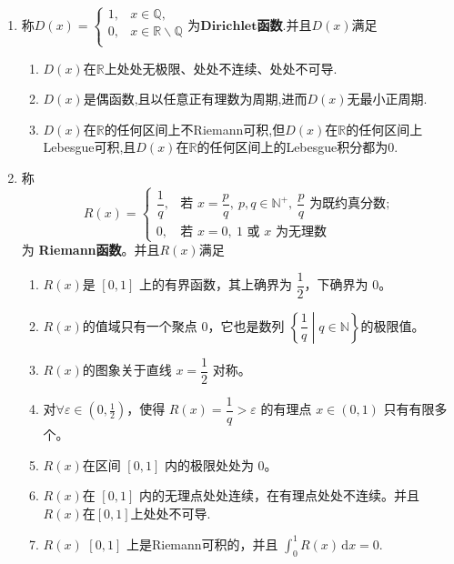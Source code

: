 \documentclass[../../main.tex]{subfiles}%
\begin{document}
\begin{theorem}[Dirichlet函数和Riemann函数的定义及其性质]\label{theorem:Dirichlet函数和Riemann函数的定义及其性质}
\begin{enumerate}
\item 称$D(x)=\begin{cases}
1,&x\in \mathbb{Q} ,\\
0,&x\in \mathbb{R} \backslash \mathbb{Q} \\
\end{cases}$为$\mathbf{Dirichlet}$\textbf{函数}.并且$D(x)$满足
\begin{enumerate}[(1)]
\item $D(x)$在$\mathbb{R}$上处处无极限、处处不连续、处处不可导.

\item $D(x)$是偶函数,且以任意正有理数为周期,进而$D(x)$无最小正周期.

\item $D(x)$在$\mathbb{R}$的任何区间上不Riemann可积,但$D(x)$在$\mathbb{R}$的任何区间上Lebesgue可积,且$D(x)$在$\mathbb{R}$的任何区间上的Lebesgue积分都为0.
\end{enumerate}

\item  称
\[
R(x) = 
\begin{cases}
\dfrac{1}{q}, & \text{若 } x = \dfrac{p}{q},\ p, q \in \mathbb{N}^+,\ \dfrac{p}{q} \text{ 为既约真分数}; \\[1em]
0, & \text{若 } x = 0,\ 1 \text{ 或 } x \text{ 为无理数}
\end{cases}
\]
为 \textbf{Riemann函数}。并且$R(x)$满足
\begin{enumerate}[(1)]
\item $R(x)$是 \([0,1]\) 上的有界函数，其上确界为 \(\dfrac{1}{2}\)，下确界为 \(0\)。
\item $R(x)$的值域只有一个聚点 \(0\)，它也是数列 \(\left\{\dfrac{1}{q}\middle| q\in\mathbb{N}\right\}\)的极限值。
\item $R(x)$的图象关于直线 \(x = \dfrac{1}{2}\) 对称。
\item 对\(\forall \varepsilon \in (0, \frac{1}{2})\)，使得 \(R(x) = \dfrac{1}{q} > \varepsilon\) 的有理点 \(x\in(0,1)\) 只有有限多个。
\item $R(x)$在区间 \([0,1]\) 内的极限处处为 \(0\)。
\item $R(x)$在 \([0,1]\) 内的无理点处处连续，在有理点处处不连续。并且$R(x)$在$[0,1]$上处处不可导.
\item $R(x)$ \([0,1]\) 上是Riemann可积的，并且 \(\displaystyle\int_0^1 R(x)\,\mathrm{d}x = 0\).
\end{enumerate}
\end{enumerate}
\end{theorem}
\end{document}
